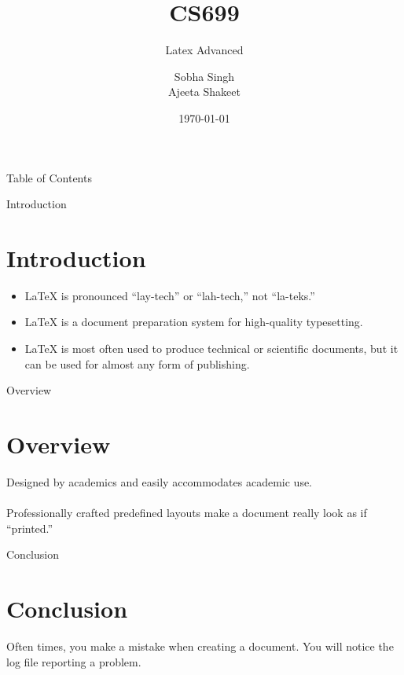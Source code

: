 \documentclass{beamer}
\title{CS699}
\subtitle{Latex Advanced}
\author{Sobha Singh \\ Ajeeta Shakeet}
\institute{ Indian Institute of Technology Bombay}
\date{\today}
\begin{document}
\begin{frame}
\titlepage
\end{frame}

\begin{frame}{Table of Contents}
    \tableofcontents
\end{frame}


\begin{frame}{Introduction}
    \section{Introduction}
    \begin{itemize}
    \item LaTeX is pronounced “lay-tech” or “lah-tech,” not “la-teks.”\\
    \item LaTeX is a document preparation system for high-quality typesetting.\\
    \item LaTeX is most often used to produce  technical or scientific documents, but it can be used for almost any form of publishing.
    \end{itemize}
\end{frame}

\begin{frame}{Overview}
    \section{Overview}
    Designed by academics and easily accommodates academic use.\\~\\
    Professionally crafted predefined layouts make a document really look as if “printed.”
\end{frame}



\begin{frame}{Conclusion}
    \section{Conclusion}
    Often times, you make a mistake when creating a document. You will notice the log file reporting a problem.\\
\end{frame}
\end{document}
